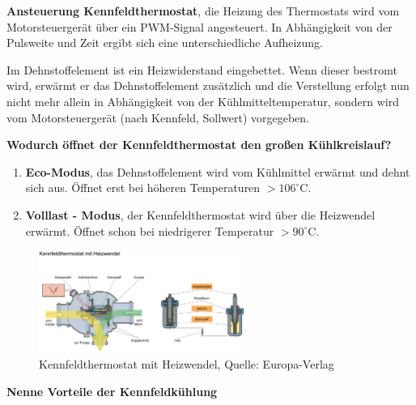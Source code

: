 \textbf{Ansteuerung Kennfeldthermostat}, die Heizung des Thermostats
wird vom Motorsteuergerät über ein PWM-Signal angesteuert. In
Abhängigkeit von der Pulsweite und Zeit ergibt sich eine
unterschiedliche Aufheizung.

Im Dehnstoffelement ist ein Heizwiderstand eingebettet. Wenn dieser
bestromt wird, erwärmt er das Dehnstoffelement zusätzlich und die
Verstellung erfolgt nun nicht mehr allein in Abhängigkeit von der
Kühlmitteltemperatur, sondern wird vom Motorsteuergerät (nach Kennfeld,
Sollwert) vorgegeben.

\textbf{Wodurch öffnet der Kennfeldthermostat den großen Kühlkreislauf?}

\begin{enumerate}
\item
  \textbf{Eco-Modus}, das Dehnstoffelement wird vom Kühlmittel erwärmt
  und dehnt sich aus. Öffnet erst bei höheren Temperaturen
  $> 106^\circ\text{C}$.
\item
  \textbf{Volllast - Modus}, der Kennfeldthermostat wird über die
  Heizwendel erwärmt. Öffnet schon bei niedrigerer Temperatur
  $> 90^\circ\text{C}$.
\end{enumerate}

\begin{figure}[!ht]%
\centering
\includegraphics[width=0.6\textwidth]{images/Kuehlsystem/Kuehlsystem-2.pdf}
\caption{Kennfeldthermostat mit Heizwendel, Quelle: Europa-Verlag}
\end{figure}

\newpage

\textbf{Nenne Vorteile der Kennfeldkühlung}

